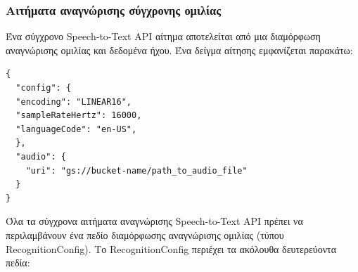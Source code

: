 \documentclass[oneside, 12pt]{book}
\begin{document}
\subsubsection{Αιτήματα αναγνώρισης σύγχρονης ομιλίας}
\label{subsec:αιτήματα-αναγνώρισης-σύγχρονης-ομιλίας}
Ένα σύγχρονο Speech-to-Text API αίτημα αποτελείται από μια διαμόρφωση αναγνώρισης ομιλίας και
δεδομένα ήχου. Ένα δείγμα αίτησης εμφανίζεται παρακάτω:
\begin{lstlisting}
{
  "config": {
  "encoding": "LINEAR16",
  "sampleRateHertz": 16000,
  "languageCode": "en-US",
  },
  "audio": {
    "uri": "gs://bucket-name/path_to_audio_file"
  }
}
\end{lstlisting}
Όλα τα σύγχρονα αιτήματα αναγνώρισης Speech-to-Text API πρέπει να περιλαμβάνουν ένα πεδίο
διαμόρφωσης αναγνώρισης ομιλίας (τύπου RecognitionConfig). Το RecognitionConfig περιέχει τα ακόλουθα
δευτερεύοντα πεδία:
\end{document}
